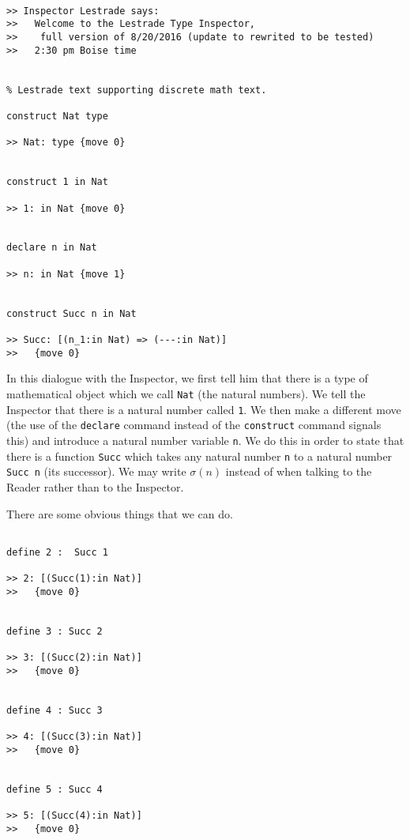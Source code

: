 \documentclass[12pt]{article}
\begin{document}
\begin{verbatim}

>> Inspector Lestrade says:  
>>   Welcome to the Lestrade Type Inspector,
>>    full version of 8/20/2016 (update to rewrited to be tested)
>>   2:30 pm Boise time


% Lestrade text supporting discrete math text.

construct Nat type

>> Nat: type {move 0}


construct 1 in Nat

>> 1: in Nat {move 0}


declare n in Nat

>> n: in Nat {move 1}


construct Succ n in Nat

>> Succ: [(n_1:in Nat) => (---:in Nat)]
>>   {move 0}

\end{verbatim}

In this dialogue with the Inspector, we first tell him that there is a type of mathematical object which we call {\tt Nat} (the natural numbers).  We tell the Inspector that there is a natural number called {\tt 1}.  We then make a different move (the use of the {\tt declare} command instead of the {\tt construct} command signals this) and introduce a natural number variable {\tt n}.  We do this in order to state that there is a function {\tt Succ} which takes
any natural number {\tt n} to a natural number {\tt Succ n} (its successor).  We may write $\sigma(n)$ instead of   when talking to the Reader rather than to the Inspector.

There are some obvious things that we can do.

\begin{verbatim}

define 2 :  Succ 1

>> 2: [(Succ(1):in Nat)]
>>   {move 0}


define 3 : Succ 2

>> 3: [(Succ(2):in Nat)]
>>   {move 0}


define 4 : Succ 3

>> 4: [(Succ(3):in Nat)]
>>   {move 0}


define 5 : Succ 4

>> 5: [(Succ(4):in Nat)]
>>   {move 0}


\end{verbatim}
\end{document}
